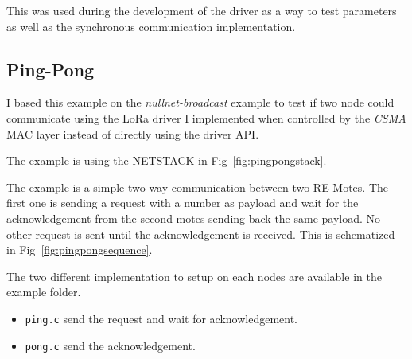 This was used during the development of the driver as a way to test parameters
as well as the synchronous communication implementation.

\subsection{Ping-Pong}

I based this example on the \emph{nullnet-broadcast} example to test if two
node could communicate using the LoRa driver I implemented when controlled by
the \emph{CSMA} MAC layer instead of directly using the driver API\@.

The example is using the NETSTACK in Fig~\ref{fig:pingpongstack}.



The example is a simple two-way communication between two RE-Motes. 
The first one is sending a request with a number as
payload and wait for the acknowledgement from the second motes sending back
the same payload. 
No other request is sent until the acknowledgement is received.
This is schematized in Fig~\ref{fig:pingpongsequence}.

The two different implementation to setup on each nodes are available in the
example folder.

\begin{itemize}
  \item \lstinline{ping.c} send the request and wait for acknowledgement.
  \item \lstinline{pong.c} send the acknowledgement.
\end{itemize}


